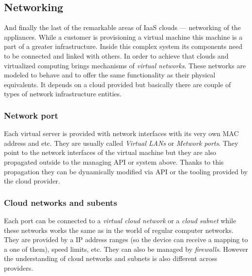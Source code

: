 \subsection{Networking}
\label{sub:Networking}

And finally the last of the remarkable areas of IaaS clouds --- networking of the appliances. While a customer is provisioning a virtual machine this machine is a part of a greater infrastructure. Inside this complex system its components need to be connected and linked with others. In order to achieve that clouds and virtualized computing brings mechanisms of \emph{virtual networks}. These networks are modeled to behave and to offer the same functionality as their physical equivalents. It depends on a cloud provided but basically there are couple of types of network infrastructure entities.

\subsubsection{Network port}
\label{subs:Network port}

Each virtual server is provided with network interfaces with its very own MAC address and etc. They are usually called \emph{Virtual LANs} or \emph{Metwork ports}. They point to the network interfaces of the virtual machine but they are also propagated outside to the managing API or system above. Thanks to this propagation they can be dynamically modified via API or the tooling provided by the cloud provider.

\subsubsection{Cloud networks and subents}
\label{subs:Cloud networks and subents}

Each port can be connected to a \emph{virtual cloud network} or a \emph{cloud subnet} while these networks works the same as in the world of regular computer networks. They are provided by a IP address ranges (so the device can receive a mapping to a one of them), speed limits, etc. They can also be managed by \emph{firewalls}. However the understanding of cloud networks and subnets is also different across providers.

